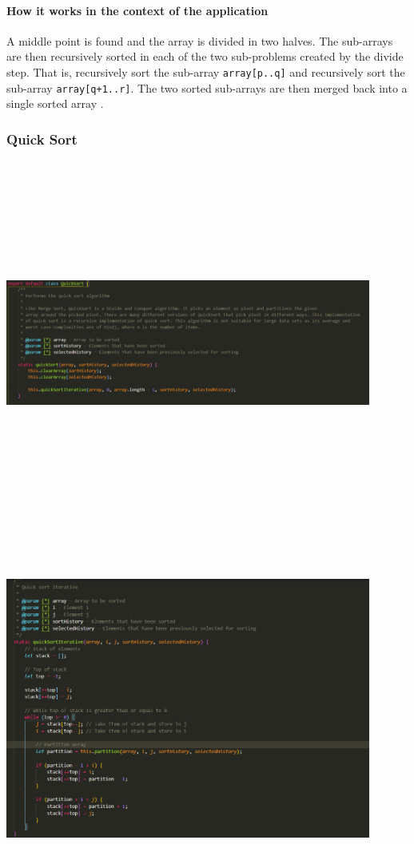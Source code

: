 \paragraph{How it works in the context of the application}
A middle point is found and the array is divided in two halves. The sub-arrays are then recursively sorted in each of the two sub-problems created by the divide step. That is, recursively sort the sub-array \lstinline{array[p..q]} and recursively sort the sub-array \lstinline{array[q+1..r]}. The two sorted sub-arrays are then merged back into a single sorted array \cite{merge_sort_geeks}.

\subsubsection{Quick Sort}
\begin{center}
    \includegraphics[width=12cm,height=12cm,keepaspectratio]{images/quicksort1}
    \includegraphics[width=12cm,height=12cm,keepaspectratio]{images/quicksort3}

\end{center}
